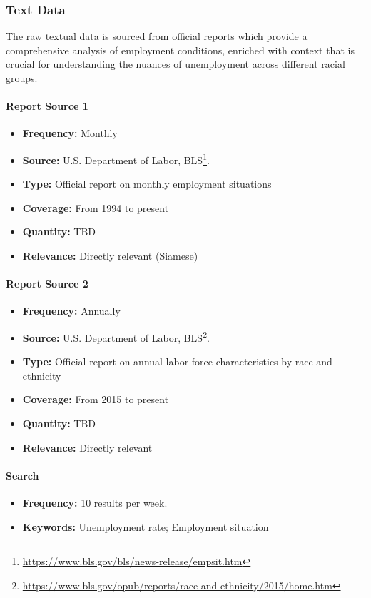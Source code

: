 \subsubsection{Text Data}
The raw textual data is sourced from official reports which provide a comprehensive analysis of employment conditions, enriched with context that is crucial for understanding the nuances of unemployment across different racial groups.

\paragraph{Report Source 1}

\begin{itemize}
    \item \textbf{Frequency:} Monthly
    \item \textbf{Source:} U.S. Department of Labor, BLS\footnote{\url{https://www.bls.gov/bls/news-release/empsit.htm}}.
    \item \textbf{Type:} Official report on monthly employment situations
    \item \textbf{Coverage:} From 1994 to present
    \item \textbf{Quantity:} TBD
    \item \textbf{Relevance:} Directly relevant (Siamese)
\end{itemize}

\paragraph{Report Source 2}
\begin{itemize}
    \item \textbf{Frequency:} Annually
    \item \textbf{Source:} U.S. Department of Labor, BLS\footnote{\url{https://www.bls.gov/opub/reports/race-and-ethnicity/2015/home.htm}}.
    \item \textbf{Type:} Official report on annual labor force characteristics by race and ethnicity
    \item \textbf{Coverage:} From 2015 to present
    \item \textbf{Quantity:} TBD
    \item \textbf{Relevance:} Directly relevant
\end{itemize}
\paragraph{Search}
\begin{itemize}
    \item \textbf{Frequency:} 10 results per week.
    \item \textbf{Keywords:} Unemployment rate; Employment situation
\end{itemize}


